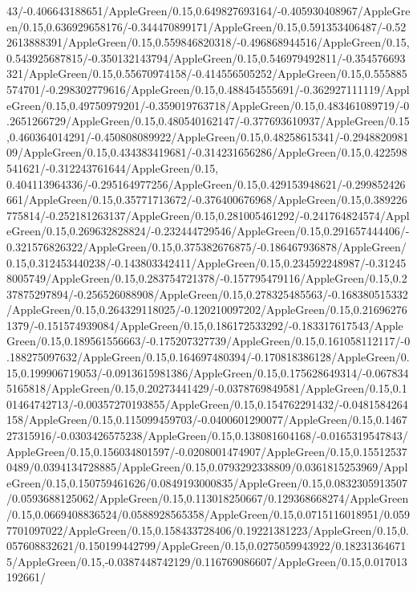 {\begin{tikzternal}
{43/-0.406643188651/AppleGreen/0.15,0.649827693164/-0.405930408967/AppleGreen/0.15,0.636929658176/-0.344470899171/AppleGreen/0.15,0.591353406487/-0.522613888391/AppleGreen/0.15,0.559846820318/-0.496868944516/AppleGreen/0.15,0.543925687815/-0.350132143794/AppleGreen/0.15,0.546979492811/-0.354576693321/AppleGreen/0.15,0.55670974158/-0.414556505252/AppleGreen/0.15,0.555885574701/-0.298302779616/AppleGreen/0.15,0.488454555691/-0.362927111119/AppleGreen/0.15,0.49750979201/-0.359019763718/AppleGreen/0.15,0.483461089719/-0.2651266729/AppleGreen/0.15,0.480540162147/-0.377693610937/AppleGreen/0.15,0.460364014291/-0.450808089922/AppleGreen/0.15,0.48258615341/-0.294882098109/AppleGreen/0.15,0.434383419681/-0.314231656286/AppleGreen/0.15,0.422598541621/-0.312243761644/AppleGreen/0.15,
0.404113964336/-0.295164977256/AppleGreen/0.15,0.429153948621/-0.299852426661/AppleGreen/0.15,0.35771713672/-0.376400676968/AppleGreen/0.15,0.389226775814/-0.252181263137/AppleGreen/0.15,0.281005461292/-0.241764824574/AppleGreen/0.15,0.269632828824/-0.232444729546/AppleGreen/0.15,0.291657444406/-0.321576826322/AppleGreen/0.15,0.375382676875/-0.186467936878/AppleGreen/0.15,0.312453440238/-0.143803342411/AppleGreen/0.15,0.234592248987/-0.312458005749/AppleGreen/0.15,0.283754721378/-0.157795479116/AppleGreen/0.15,0.237875297894/-0.256526088908/AppleGreen/0.15,0.278325485563/-0.168380515332/AppleGreen/0.15,0.264329118025/-0.120210097202/AppleGreen/0.15,0.216962761379/-0.151574939084/AppleGreen/0.15,0.186172533292/-0.183317617543/AppleGreen/0.15,0.189561556663/-0.175207327739/AppleGreen/0.15,0.161058112117/-0.188275097632/AppleGreen/0.15,0.164697480394/-0.170818386128/AppleGreen/0.15,0.199906719053/-0.0913615981386/AppleGreen/0.15,0.175628649314/-0.0678345165818/AppleGreen/0.15,0.20273441429/-0.0378769849581/AppleGreen/0.15,0.101464742713/-0.00357270193855/AppleGreen/0.15,0.154762291432/-0.0481584264158/AppleGreen/0.15,0.115099459703/-0.0400601290077/AppleGreen/0.15,0.146727315916/-0.0303426575238/AppleGreen/0.15,0.138081604168/-0.0165319547843/AppleGreen/0.15,0.156034801597/-0.0208001474907/AppleGreen/0.15,0.155125370489/0.0394134728885/AppleGreen/0.15,0.0793292338809/0.0361815253969/AppleGreen/0.15,0.150759461626/0.0849193000835/AppleGreen/0.15,0.0832305913507/0.0593688125062/AppleGreen/0.15,0.113018250667/0.129368668274/AppleGreen/0.15,0.0669408836524/0.0588928565358/AppleGreen/0.15,0.0715116018951/0.0597701097022/AppleGreen/0.15,0.158433728406/0.19221381223/AppleGreen/0.15,0.057608832621/0.150199442799/AppleGreen/0.15,0.0275059943922/0.182313646715/AppleGreen/0.15,-0.0387448742129/0.116769086607/AppleGreen/0.15,0.017013192661/
}
\end{tikzternal}}
